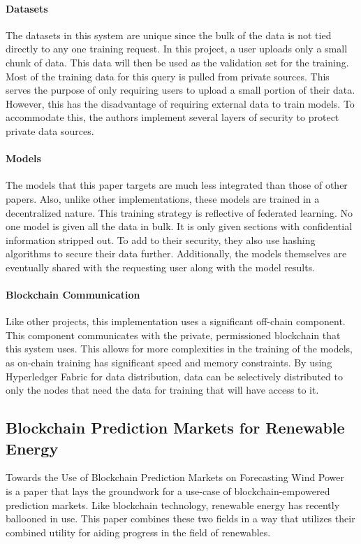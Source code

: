 \documentclass{ledger}
\begin{document}
\paragraph{Datasets}
The datasets in this system are unique since the bulk of the data is not tied directly to any one training request.
In this project, a user uploads only a small chunk of data.  This data will then be used as the validation set for the
training.  Most of the training data for this query is pulled from private sources.  This serves the purpose of only
requiring users to upload a small portion of their data.  However, this has the disadvantage of requiring external data
to train models.  To accommodate this, the authors implement several layers of security to protect private data sources.

\paragraph{Models}
The models that this paper targets are much less integrated than those of other papers.  Also, unlike other
implementations, these models are trained in a decentralized nature.  This training strategy is reflective of federated
learning.  No one model is given all the data in bulk. It is only given sections with confidential information stripped
out. To add to their security, they also use hashing algorithms to secure their data further.  Additionally, the models
themselves are eventually shared with the requesting user along with the model results.

\paragraph{Blockchain Communication}
Like other projects, this implementation uses a significant off-chain component.  This component communicates with the
private, permissioned blockchain that this system uses.  This allows for more complexities in the training of the models,
as on-chain training has significant speed and memory constraints.  By using Hyperledger Fabric for data distribution,
data can be selectively distributed to only the nodes that need the data for training that will
have access to it.

\subsection{Blockchain Prediction Markets for Renewable Energy}

Towards the Use of Blockchain Prediction Markets on Forecasting Wind Power~\cite{windForcasting} is a paper that lays
the groundwork for a use-case of blockchain-empowered prediction markets. Like blockchain technology, renewable energy
has recently ballooned in use.  This paper combines these two fields in a way that utilizes their combined utility for
aiding progress in the field of renewables.
\end{document}
